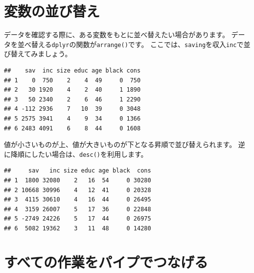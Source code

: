 \documentclass[]{book}
\newenvironment{Shaded}{\begin{snugshade}}{\end{snugshade}}
\newcommand{\KeywordTok}[1]{\textcolor[rgb]{0.13,0.29,0.53}{\textbf{#1}}}
\newcommand{\StringTok}[1]{\textcolor[rgb]{0.31,0.60,0.02}{#1}}
\newcommand{\OperatorTok}[1]{\textcolor[rgb]{0.81,0.36,0.00}{\textbf{#1}}}
\newcommand{\NormalTok}[1]{#1}
\begin{document}
\section{変数の並び替え}\label{ux5909ux6570ux306eux4e26ux3073ux66ffux3048}

データを確認する際に、ある変数をもとに並べ替えたい場合があります。
データを並べ替える\texttt{dplyr}の関数が\texttt{arrange()}です。
ここでは、\texttt{saving}を収入\texttt{inc}で並び替えてみましょう。

\begin{Shaded}
\end{Shaded}

\begin{verbatim}
##    sav  inc size educ age black cons
## 1    0  750    2    4  49     0  750
## 2   30 1920    4    2  40     1 1890
## 3   50 2340    2    6  46     1 2290
## 4 -112 2936    7   10  39     0 3048
## 5 2575 3941    4    9  34     0 1366
## 6 2483 4091    6    8  44     0 1608
\end{verbatim}

値が小さいものが上、値が大きいものが下となる昇順で並び替えられます。
逆に降順にしたい場合は、\texttt{desc()}を利用します。

\begin{Shaded}
\end{Shaded}

\begin{verbatim}
##     sav   inc size educ age black  cons
## 1  1800 32080    2   16  54     0 30280
## 2 10668 30996    4   12  41     0 20328
## 3  4115 30610    4   16  44     0 26495
## 4  3159 26007    5   17  36     0 22848
## 5 -2749 24226    5   17  44     0 26975
## 6  5082 19362    3   11  48     0 14280
\end{verbatim}

\section{すべての作業をパイプでつなげる}\label{ux3059ux3079ux3066ux306eux4f5cux696dux3092ux30d1ux30a4ux30d7ux3067ux3064ux306aux3052ux308b}
\end{document}
